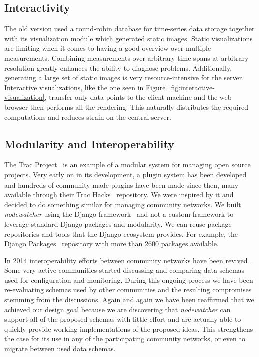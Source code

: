 \documentclass[5p,sort&compress]{elsarticle}
\newcommand{\nodewatcher}{\textit{nodewatcher}}
\begin{document}
\subsection{Interactivity}

The old version used a round-robin database for time-series data storage together with its visualization module which generated static images.
Static visualizations are limiting when it comes to having a good overview over multiple measurements.
Combining measurements over arbitrary time spans at arbitrary resolution greatly enhances the ability to diagnose problems.
Additionally, generating a large set of static images is very resource-intensive for the server.
Interactive visualizations, like the one seen in Figure~\ref{fig:interactive-visualization}, transfer only data points to the client machine and the web browser then performs all the rendering.
This naturally distributes the required computations and reduces strain on the central server.

\subsection{Modularity and Interoperability}

The Trac Project~\cite{Trac_2003} is an example of a modular system for managing open source projects.
Very early on in its development, a plugin system has been developed and hundreds of community-made plugins have been made since then, many available through their Trac Hacks~\cite{TracHacks_2004} repository.
We were inspired by it and decided to do something similar for managing community networks.
We built \nodewatcher{} using the Django framework~\cite{django_2005} and not a custom framework to leverage standard Django packages and modularity.
We can reuse package repositories and tools that the Django ecosystem provides.
For example, the Django Packages~\cite{DjangoPackages_2010} repository with more than 2600 packages available.

In 2014 interoperability efforts between community networks have been revived~\cite{interop_2010}.
Some very active communities started discussing and comparing data schemas used for configuration and monitoring.
During this ongoing process we have been re-evaluating schemas used by other communities and the resulting compromises stemming from the discussions.
Again and again we have been reaffirmed that we achieved our design goal because we are discovering that \nodewatcher{} can support all of the proposed schemas with little effort and are actually able to quickly provide working implementations of the proposed ideas.
This strengthens the case for its use in any of the participating community networks, or even to migrate between used data schemas.
\end{document}
